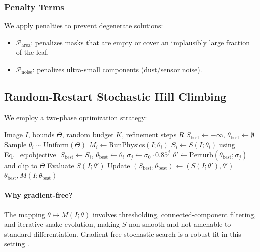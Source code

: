 \documentclass[11pt,a4paper]{article}
\begin{document}
\subsubsection{Penalty Terms}
We apply penalties to prevent degenerate solutions:
\begin{itemize}
    \item $\mathcal{P}_{\mathrm{area}}$: penalizes masks that are empty or cover an implausibly large fraction of the leaf.
    \item $\mathcal{P}_{\mathrm{noise}}$: penalizes ultra-small components (dust/sensor noise).
\end{itemize}

\subsection{Random-Restart Stochastic Hill Climbing}
We employ a two-phase optimization strategy:
\begin{algorithm}
\caption{Stochastic Parameter Optimization (per image)}
\begin{algorithmic}[1]
\REQUIRE Image $I$, bounds $\Theta$, random budget $K$, refinement steps $R$
\STATE $S_{\mathrm{best}} \leftarrow -\infty$, $\theta_{\mathrm{best}}\leftarrow \emptyset$
    \STATE Sample $\theta_i \sim \mathrm{Uniform}(\Theta)$
    \STATE $M_i \leftarrow \mathrm{RunPhysics}(I;\theta_i)$
    \STATE $S_i \leftarrow S(I;\theta_i)$ using Eq.~\eqref{eq:objective}
        \STATE $S_{\mathrm{best}}\leftarrow S_i$, $\theta_{\mathrm{best}}\leftarrow \theta_i$
    \ENDIF
\ENDFOR
{}
    \STATE $\sigma_j \leftarrow \sigma_0 \cdot 0.85^j$ 
    \STATE $\theta' \leftarrow \mathrm{Perturb}(\theta_{\mathrm{best}};\sigma_j)$ and clip to $\Theta$
    \STATE Evaluate $S(I;\theta')$
        \STATE Update $(S_{\mathrm{best}},\theta_{\mathrm{best}})\leftarrow (S(I;\theta'),\theta')$
    \ENDIF
\ENDFOR
\RETURN $\theta_{\mathrm{best}}, M(I;\theta_{\mathrm{best}})$
\end{algorithmic}
\end{algorithm}

\paragraph{Why gradient-free?}
The mapping $\theta \mapsto M(I;\theta)$ involves thresholding, connected-component filtering, and iterative snake evolution, making $S$ non-smooth and not amenable to standard differentiation. Gradient-free stochastic search is a robust fit in this setting \citep{yu2020hyperparam}.
\end{document}
